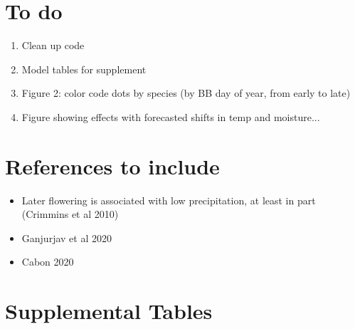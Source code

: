 \documentclass{article}
\begin{document}


\section* {To do}
\begin{enumerate}
\item Clean up code
\item Model tables for supplement
\item Figure 2: color code dots by species (by BB day of year, from early to late)
\item Figure showing effects with forecasted shifts in temp and moisture...

\end{enumerate}
\section*{References to include}
\begin{itemize}
\item Later flowering is  associated with low precipitation, at least in part (Crimmins et al 2010)
\item Ganjurjav et al 2020
\item Cabon 2020
\end{itemize}

\clearpage
\section* {Supplemental Tables}
\end{document}

